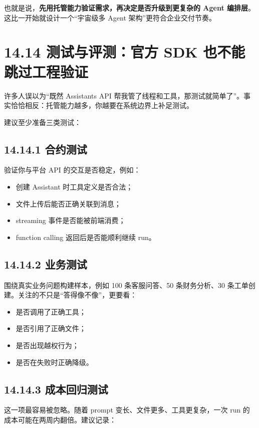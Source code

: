 也就是说，\textbf{先用托管能力验证需求，再决定是否升级到更复杂的 Agent 编排层}。这比一开始就设计一个``宇宙级多 Agent 架构''更符合企业交付节奏。


\section{14.14 测试与评测：官方 SDK 也不能跳过工程验证}

许多人误以为``既然 Assistants API 帮我管了线程和工具，那测试就简单了''。事实恰恰相反：托管能力越多，你越要在系统边界上补足测试。


建议至少准备三类测试：


\subsection{14.14.1 合约测试}

验证你与平台 API 的交互是否稳定，例如：


\begin{itemize}[leftmargin=2em]
\item 创建 Assistant 时工具定义是否合法；
\item 文件上传后能否正确关联到消息；
\item streaming 事件是否能被前端消费；
\item function calling 返回后是否能顺利继续 run。
\end{itemize}

\subsection{14.14.2 业务测试}

围绕真实业务问题构建样本，例如 100 条客服问答、50 条财务分析、30 条工单创建。关注的不只是``答得像不像''，更要看：


\begin{itemize}[leftmargin=2em]
\item 是否调用了正确工具；
\item 是否引用了正确文件；
\item 是否出现越权行为；
\item 是否在失败时正确降级。
\end{itemize}

\subsection{14.14.3 成本回归测试}

这一项最容易被忽略。随着 prompt 变长、文件更多、工具更复杂，一次 run 的成本可能在两周内翻倍。建议记录：


